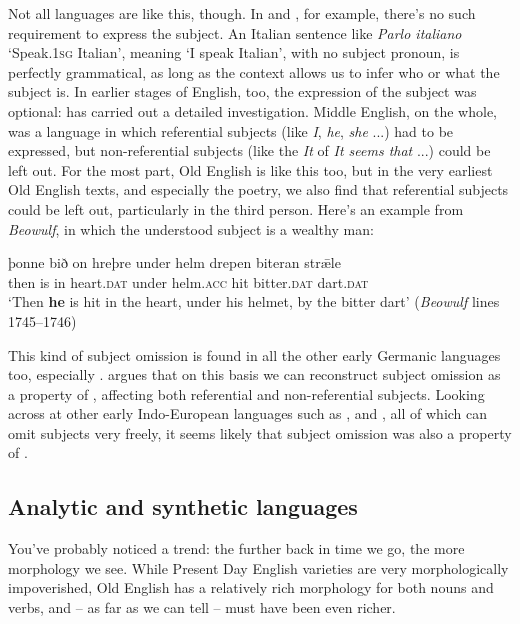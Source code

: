 Not all languages are like this, though. In  and , for example, there's no such requirement to express the subject. An Italian sentence like \emph{Parlo italiano} `Speak.\textsc{1sg} Italian', meaning `I speak Italian', with no subject pronoun, is perfectly grammatical, as long as the context allows us to infer who or what the subject is. In earlier stages of English, too, the expression of the subject was optional: \citet{Rusten2019} has carried out a detailed investigation. Middle English, on the whole, was a language in which referential subjects (like \emph{I}, \emph{he}, \emph{she} ...) had to be expressed, but non-referential subjects (like the \emph{It} of \emph{It seems that} ...) could be left out. For the most part, Old English is like this too, but in the very earliest Old English texts, and especially the poetry, we also find that referential subjects could be left out, particularly in the third person. Here's an example from \emph{Beowulf}, in which the understood subject is a wealthy man:

\begin{exe}
\ex 
    \gll þonne bið on hreþre under helm drepen biteran strǣle\\
    then is in heart.\textsc{dat} under helm.\textsc{acc} hit bitter.\textsc{dat} dart.\textsc{dat}\\
    \trans `Then \textbf{he} is hit in the heart, under his helmet, by the bitter dart' \hfill(\emph{Beowulf} lines 1745--1746)
\label{Beowulf-ex}
\end{exe}

\noindent This kind of subject omission is found in all the other early Germanic languages too, especially . \citet[Chapter 5]{Walkden2014} argues that on this basis we can reconstruct subject omission as a property of , affecting both referential and non-referential subjects. Looking across at other early Indo-European languages such as ,  and , all of which can omit subjects very freely, it seems likely that subject omission was also a property of .

\subsection{Analytic and synthetic languages}\label{prehistory-analyticity}
You've probably noticed a trend: the further back in time we go, the more morphology we see. While Present Day English varieties are very morphologically impoverished, Old English has a relatively rich  morphology for both nouns and verbs, and  -- as far as we can tell -- must have been even richer.

